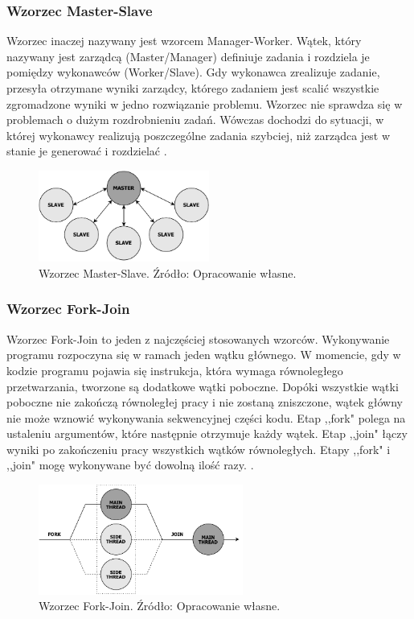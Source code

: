 \documentclass[12pt]{article}
\begin{document}
\subsubsection{Wzorzec Master-Slave}
Wzorzec inaczej nazywany jest wzorcem Manager-Worker. Wątek, który nazywany jest zarządcą (Master/Manager)
definiuje zadania i rozdziela je pomiędzy wykonawców (Worker/Slave). Gdy wykonawca zrealizuje zadanie, przesyła
otrzymane wyniki zarządcy, którego zadaniem jest scalić wszystkie zgromadzone wyniki w jedno rozwiązanie problemu.
Wzorzec nie sprawdza się w problemach o dużym rozdrobnieniu zadań. Wówczas dochodzi do sytuacji, w której wykonawcy realizują poszczególne zadania
szybciej, niż zarządca jest w stanie je generować i rozdzielać \cite{wprowadzenie-do-obliczen-rownoleglych}.

\begin{figure}[H]
    \centering
	\includegraphics[width=0.5\textwidth]{patterns-master-slave.pdf}
    \caption{Wzorzec Master-Slave. Źródło: Opracowanie własne.}
    \label{fig:master-slave}
\end{figure}

\subsubsection{Wzorzec Fork-Join}
Wzorzec Fork-Join to jeden z najczęściej stosowanych wzorców. Wykonywanie programu rozpoczyna się
w ramach jeden wątku głównego. W momencie, gdy w kodzie programu pojawia się instrukcja, która wymaga
równoległego przetwarzania, tworzone są dodatkowe wątki poboczne. Dopóki wszystkie
wątki poboczne nie zakończą równoległej pracy i nie zostaną zniszczone, wątek główny nie może wznowić wykonywania
sekwencyjnej części kodu. Etap ,,fork" polega na ustaleniu argumentów, które następnie otrzymuje każdy wątek.
Etap ,,join" łączy wyniki po zakończeniu pracy wszystkich wątków równoległych. Etapy ,,fork" i ,,join"
mogę wykonywane być dowolną ilość razy. \cite{parallel-design-patterns}.

\begin{figure}[H]
    \centering
	\includegraphics[width=0.6\textwidth]{patterns-fork-join.pdf}
    \caption{Wzorzec Fork-Join. Źródło: Opracowanie własne.}
    \label{fig:fork-join}
\end{figure}
\end{document}
